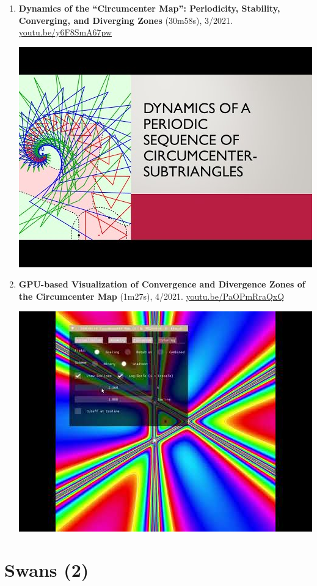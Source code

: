\documentclass[12pt]{article}
\begin{document}
\begin{enumerate}[resume]
% 
\item \textbf{Dynamics of the ``Circumcenter Map'': Periodicity, Stability, Converging, and Diverging Zones} (30m58s), 3/2021. \href{https://youtu.be/y6F8SmA67pw}{\url{youtu.be/y6F8SmA67pw}}
\begin{center}\includegraphics[width=.5\textwidth]{pics/y6F8SmA67pw.jpg}\end{center}
% 
\item \textbf{GPU-based Visualization of Convergence and Divergence Zones of the Circumcenter Map} (1m27s), 4/2021. \href{https://youtu.be/PaOPmRraQxQ}{\url{youtu.be/PaOPmRraQxQ}}
\begin{center}\includegraphics[width=.5\textwidth]{pics/PaOPmRraQxQ.jpg}\end{center}
% 
\end{enumerate}

\section{Swans (2)}
\end{document}
